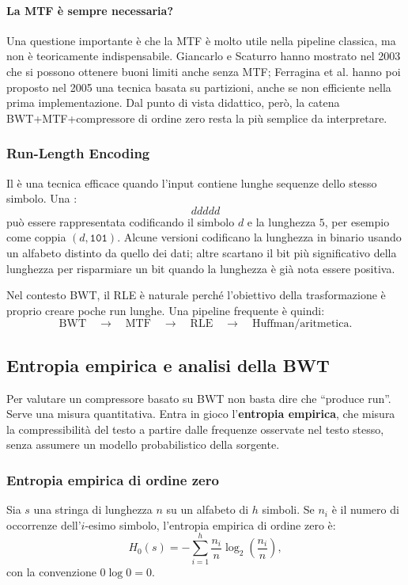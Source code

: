 \documentclass{article}
\theoremstyle{definition}
\numberwithin{equation}{section}
\begin{document}
\paragraph{La MTF è sempre necessaria?}
Una questione importante è che la MTF è molto utile nella pipeline classica, ma non è teoricamente indispensabile. Giancarlo e Scaturro hanno mostrato nel 2003 che si possono ottenere buoni limiti anche senza MTF; Ferragina et al. hanno poi proposto nel 2005 una tecnica basata su partizioni, anche se non efficiente nella prima implementazione. Dal punto di vista didattico, però, la catena BWT+MTF+compressore di ordine zero resta la più semplice da interpretare.

\subsubsection{Run-Length Encoding}
Il \textbf{} è una tecnica efficace quando l'input contiene lunghe sequenze dello stesso simbolo. Una :
\[
    ddddd
\]
può essere rappresentata codificando il simbolo $d$ e la lunghezza $5$, per esempio come coppia $(d,\texttt{101})$. Alcune versioni codificano la lunghezza in binario usando un alfabeto distinto da quello dei dati; altre scartano il bit più significativo della lunghezza per risparmiare un bit quando la lunghezza è già nota essere positiva.

Nel contesto BWT, il RLE è naturale perché l'obiettivo della trasformazione è proprio creare poche run lunghe. Una pipeline frequente è quindi:
\[
    \text{BWT}
    \quad\longrightarrow\quad
    \text{MTF}
    \quad\longrightarrow\quad
    \text{RLE}
    \quad\longrightarrow\quad
    \text{Huffman/aritmetica}.
\]

\subsection{Entropia empirica e analisi della BWT}
Per valutare un compressore basato su BWT non basta dire che ``produce run''. Serve una misura quantitativa. Entra in gioco l'\textbf{entropia empirica}, che misura la compressibilità del testo a partire dalle frequenze osservate nel testo stesso, senza assumere un modello probabilistico della sorgente.

\subsubsection{Entropia empirica di ordine zero}
Sia $s$ una stringa di lunghezza $n$ su un alfabeto di $h$ simboli. Se $n_i$ è il numero di occorrenze dell'$i$-esimo simbolo, l'entropia empirica di ordine zero è:
\begin{equation}\label{eq:zero_order_empirical_entropy}
    H_0(s)
    =
    -\sum_{i=1}^{h}
    \frac{n_i}{n}
    \log_2\left(\frac{n_i}{n}\right),
\end{equation}
con la convenzione $0\log 0=0$.
\end{document}
